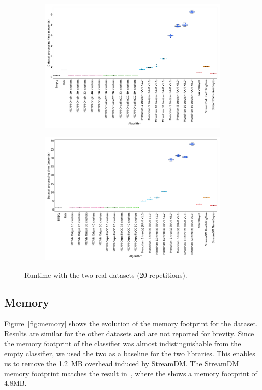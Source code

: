 \begin{figure}
	\begin{subfigure}[t]{.49\linewidth}
		\includegraphics[width=\linewidth]{figures/results/banos_6_runtime.png}
		\caption{\banosdataset}
		\label{fig:runtime-banos}
	\end{subfigure}
	\hfill
	\begin{subfigure}[t]{.49\linewidth}
		\includegraphics[width=\linewidth]{figures/results/recofit_6_runtime.png}
		\caption{\recofitdataset}
		\label{fig:runtime-recofit}
	\end{subfigure}
	\caption{Runtime with the two real datasets (20 repetitions).}
	\label{fig:runtime}
\end{figure}

\subsection{Memory}
\label{sec:result-memory}
Figure~\ref{fig:memory} shows the evolution of the memory footprint for the
\banosdataset dataset. Results are similar for the other datasets and are
not reported for brevity. Since the  memory footprint of the \naivebayes
classifier was almost indistinguishable from the empty classifier, we used
the two \naivebayes as a baseline for the two libraries. This enables us to
remove the 1.2~MB overhead induced by StreamDM. The StreamDM memory
footprint matches the result in~\cite{StreamDM-CPP}, where the
\hoeffdingtree shows a memory footprint of 4.8MB.

